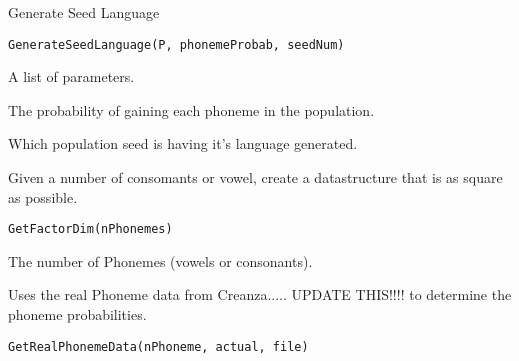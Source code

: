 \documentclass[a4paper]{book}
\begin{document}
%
\begin{Description}\relax
Generate Seed Language
\end{Description}
%
\begin{Usage}
\begin{verbatim}
GenerateSeedLanguage(P, phonemeProbab, seedNum)
\end{verbatim}
\end{Usage}
%
\begin{Arguments}
\begin{ldescription}
\item[\code{P}] A list of parameters.

\item[\code{phonemeProbab}] The probability of gaining each phoneme in the population.

\item[\code{seedNum}] Which population seed is having it's language generated.
\end{ldescription}
\end{Arguments}
%
\begin{Description}\relax
Given a number of consomants or vowel, create a datastructure that is as square as possible.
\end{Description}
%
\begin{Usage}
\begin{verbatim}
GetFactorDim(nPhonemes)
\end{verbatim}
\end{Usage}
%
\begin{Arguments}
\begin{ldescription}
\item[\code{nPhonemes}] The number of Phonemes (vowels or consonants).
\end{ldescription}
\end{Arguments}
%
\begin{Description}\relax
Uses the real Phoneme data from Creanza..... UPDATE THIS!!!! to determine the phoneme probabilities.
\end{Description}
%
\begin{Usage}
\begin{verbatim}
GetRealPhonemeData(nPhoneme, actual, file)
\end{verbatim}
\end{Usage}
\end{document}
